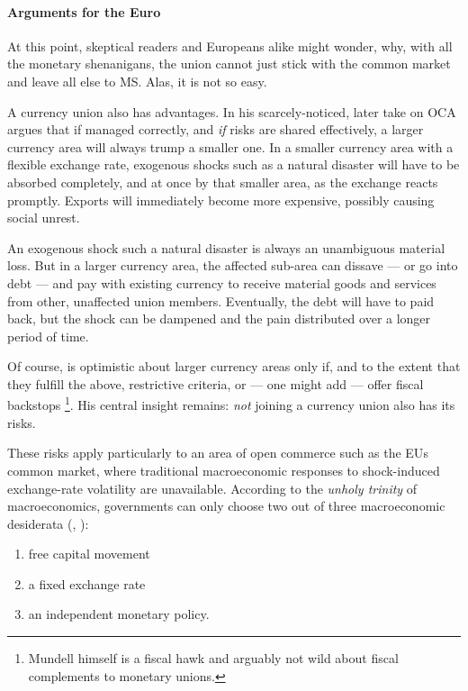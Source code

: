 \documentclass[11pt,a4paper,oneside]{article}
\begin{document}

\paragraph{Arguments for the Euro} At this point, skeptical readers and Europeans alike might wonder, why, with all the monetary shenanigans, the union cannot just stick with the common market and leave all else to \gls{MS}. 
Alas, it is not so easy.

A currency union also has advantages. 
In his scarcely-noticed, later take on \gls{OCA} \cite{Mundell1972} argues that if managed correctly, and \emph{if} risks are shared effectively, a larger currency area will always trump a smaller one. 
In a smaller currency area with a flexible exchange rate, exogenous shocks such as a natural disaster will have to be absorbed completely, and at once by that smaller area, as the exchange reacts promptly. 
Exports will immediately become more expensive, possibly causing social unrest.

An exogenous shock such a natural disaster is always an unambiguous material loss. 
But in a larger currency area, the affected sub-area can dissave --- or go into debt --- and pay with existing currency to receive material goods and services from other, unaffected union members. 
Eventually, the debt will have to paid back, but the shock can be dampened and the pain distributed over a longer period of time.

Of course, \cite{Mundell1972} is optimistic about larger currency areas only if, and to the extent that they fulfill the above, restrictive criteria, or --- one might add --- offer fiscal backstops\ignorespaces
\footnote{
	Mundell himself is a fiscal hawk and arguably not wild about fiscal complements to monetary unions.
}.
His central insight remains: 
\emph{not} joining a currency union also has its risks.

These risks apply particularly to an area of open commerce such as the \gls{EU}s common market, where traditional macroeconomic responses to shock-induced exchange-rate volatility are unavailable. 
According to the \emph{unholy trinity} of macroeconomics, governments can only choose two out of three macroeconomic desiderata (\citealt{Mundell1963}, \citealt{Fleming1962}):
\begin{enumerate}
	\item free capital movement
	\item a fixed exchange rate
	\item an independent monetary policy.
\end{enumerate}
\end{document}
